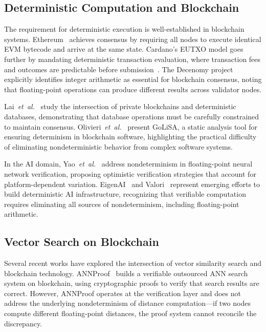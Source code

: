 \documentclass[10pt,journal]{IEEEtran}
\newcommand{\etal}{\textit{et~al.}}
\begin{document}
\subsection{Deterministic Computation and Blockchain}

The requirement for deterministic execution is well-established in blockchain systems. Ethereum~\cite{buterin2014ethereum} achieves consensus by requiring all nodes to execute identical EVM bytecode and arrive at the same state. Cardano's EUTXO model goes further by mandating deterministic transaction evaluation, where transaction fees and outcomes are predictable before submission~\cite{cardano2024fees}. The Decenomy project~\cite{decenomy2024integer} explicitly identifies integer arithmetic as essential for blockchain consensus, noting that floating-point operations can produce different results across validator nodes.

Lai~\etal{}~\cite{lai2022blockchain} study the intersection of private blockchains and deterministic databases, demonstrating that database operations must be carefully constrained to maintain consensus. Olivieri~\etal{}~\cite{olivieri2022golisa} present GoLiSA, a static analysis tool for ensuring determinism in blockchain software, highlighting the practical difficulty of eliminating nondeterministic behavior from complex software systems.

In the AI domain, Yao~\etal{}~\cite{yao2025nao} address nondeterminism in floating-point neural network verification, proposing optimistic verification strategies that account for platform-dependent variation. EigenAI~\cite{alves2026eigenai} and Valori~\cite{gudur2025valori} represent emerging efforts to build deterministic AI infrastructure, recognizing that verifiable computation requires eliminating all sources of nondeterminism, including floating-point arithmetic.

\subsection{Vector Search on Blockchain}

Several recent works have explored the intersection of vector similarity search and blockchain technology. ANNProof~\cite{lu2024annproof} builds a verifiable outsourced ANN search system on blockchain, using cryptographic proofs to verify that search results are correct. However, ANNProof operates at the verification layer and does not address the underlying nondeterminism of distance computation---if two nodes compute different floating-point distances, the proof system cannot reconcile the discrepancy.
\end{document}
